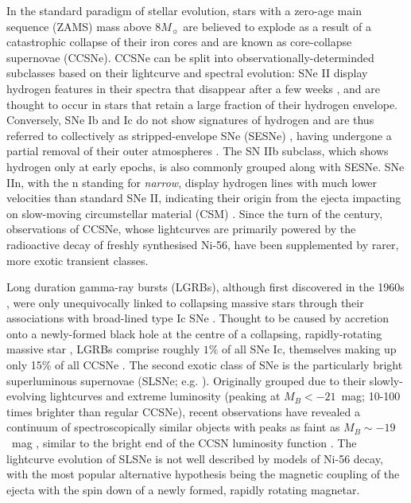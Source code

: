 \documentclass[fleqn,usenatbib,]{mnras}
\newcommand{\replylluis}[1]{\color{brown}#1 \color{black}}
\begin{document}
In the standard paradigm of stellar evolution, stars with a zero-age main sequence (ZAMS) mass above $8M_{\sun}$ are believed to explode as a result of a catastrophic collapse of their iron cores and are known as core-collapse supernovae (CCSNe). CCSNe can be split into observationally-determinded subclasses based on their lightcurve and spectral evolution: SNe II display hydrogen features in their spectra \replylluis{that disappear after a few weeks}, and are thought to occur in stars that retain a large fraction of their hydrogen envelope. Conversely, SNe Ib and Ic do not show signatures of hydrogen and are thus referred to collectively as stripped-envelope SNe (SESNe) \replylluis{, having undergone a partial removal of their outer atmospheres}. The SN IIb subclass, which shows hydrogen only at early epochs, is also commonly grouped along with SESNe. \replylluis{SNe IIn, with the n standing for \textit{narrow}, display hydrogen lines with much lower velocities than standard SNe II, indicating their origin from the ejecta impacting on slow-moving circumstellar material (CSM)}. Since the turn of the century, observations of CCSNe, whose lightcurves are primarily powered by the radioactive decay of freshly synthesised Ni-56, have been supplemented by rarer, more exotic transient classes.

 Long duration gamma-ray bursts (LGRBs), although first discovered in the 1960s \citep{Klebesadel1973}, were only unequivocally linked to collapsing massive stars through their associations with broad-lined type Ic SNe \citep{Galama1998,Hjorth2003}. Thought to be caused by accretion onto a newly-formed black hole at the centre of a collapsing, rapidly-rotating massive star \citep[e.g.][]{Woosley1993,Woosley2006a,Woosley2006b}, LGRBs comprise roughly $1\%$ of all SNe Ic, themselves making up only 15\% of all CCSNe \citep{Kelly2012,Graham2016}. The second exotic class of SNe is the particularly bright superluminous supernovae (SLSNe; e.g. \citealt{Quimby2011, Gal-Yam2012}). Originally grouped due to their slowly-evolving lightcurves and extreme luminosity (peaking at $M_B < -21$~mag; 10-100 times brighter than regular CCSNe), recent observations have revealed a continuum of spectroscopically similar objects with peaks as faint as $M_B \sim -19$~mag \citep{DeCia2018,Lunnan2018,Angus2019}, similar to the bright end of the CCSN luminosity function \citep{Li2011}. The lightcurve evolution of SLSNe is not well described by models of Ni-56 decay, with the most popular alternative hypothesis being the magnetic coupling of the ejecta with the spin down of a newly formed, rapidly rotating magnetar.
 
\end{document}
